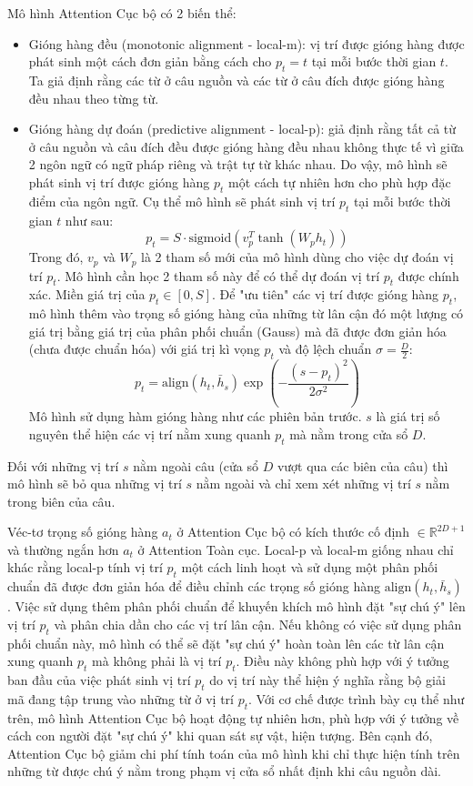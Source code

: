 Mô hình Attention Cục bộ có 2 biến thể:
\begin{itemize}
	\item Gióng hàng đều (monotonic alignment - local-m): vị trí được gióng hàng được phát sinh một cách đơn giản bằng cách cho $p_t = t$ tại mỗi bước thời gian $t$. Ta giả định rằng các từ ở câu nguồn và các từ ở câu đích được gióng hàng đều nhau theo từng từ.
	\item Gióng hàng dự đoán (predictive alignment - local-p): giả định rằng tất cả từ ở câu nguồn và câu đích đều được gióng hàng đều nhau không thực tế vì giữa 2 ngôn ngữ có ngữ pháp riêng và trật tự từ khác nhau. Do vậy, mô hình sẽ phát sinh vị trí được gióng hàng $p_t$ một cách tự nhiên hơn cho phù hợp đặc điểm của ngôn ngữ. Cụ thể mô hình sẽ phát sinh vị trí $p_t$ tại mỗi bước thời gian $t$ như sau:
	\begin{equation}
	p_t = S \cdot \text{sigmoid} (v^T_p \tanh(W_p h_t))
	\end{equation}
	Trong đó, $v_p$ và $W_p$ là 2 tham số mới của mô hình dùng cho việc dự đoán vị trí $p_t$. Mô hình cần học 2 tham số này để có thể dự đoán vị trí $p_t$ được chính xác. Miền giá trị của $p_t \in [0, S]$.
	Để "ưu tiên" các vị trí được gióng hàng $p_t$, mô hình thêm vào trọng số gióng hàng của những từ lân cận đó một lượng có giá trị bằng giá trị của phân phối chuẩn (Gauss) mà đã được đơn giản hóa (chưa được chuẩn hóa) với giá trị kì vọng $p_t$ và độ lệch chuẩn $\sigma = \frac{D}{2}$:
	\begin{equation}
	p_t = \text{align}(h_t, \bar{h}_s)\exp\left(-\frac{(s-p_t)^2}{2\sigma^2}\right)
	\end{equation}
	Mô hình sử dụng hàm gióng hàng như các phiên bản trước. $s$ là giá trị số nguyên thể hiện các vị trí nằm xung quanh $p_t$ mà nằm trong cửa sổ $D$.
\end{itemize}
 Đối với những vị trí $s$ nằm ngoài câu (cửa sổ $D$ vượt qua các biên của câu) thì mô hình sẽ bỏ qua những vị trí $s$ nằm ngoài và chỉ xem xét những vị trí $s$ nằm trong biên của câu.
 
 Véc-tơ trọng số gióng hàng $a_t$ ở Attention Cục bộ có kích thước cố định $\in \mathbb{R}^{2D + 1}$ và thường ngắn hơn $a_t$ ở Attention Toàn cục. Local-p và local-m giống nhau chỉ khác rằng local-p tính vị trí $p_t$ một cách linh hoạt và sử dụng một phân phối chuẩn đã được đơn giản hóa để điều chỉnh các trọng số gióng hàng $\text{align}(h_t, \bar{h}_s)$. Việc sử dụng thêm phân phối chuẩn để khuyến khích mô hình đặt "sự chú ý" lên vị trí $p_t$ và phân chia dần cho các vị trí lân cận. Nếu không có việc sử dụng phân phối chuẩn này, mô hình có thể sẽ đặt "sự chú ý" hoàn toàn lên các từ lân cận xung quanh $p_t$ mà không phải là vị trí $p_t$. Điều này không phù hợp với ý tưởng ban đầu của việc phát sinh vị trí $p_t$ do vị trí này thể hiện ý nghĩa rằng bộ giải mã đang tập trung vào những từ ở vị trí $p_t$.
Với cơ chế được trình bày cụ thể như trên, mô hình Attention Cục bộ hoạt động tự nhiên hơn, phù hợp với ý tưởng về cách con người đặt "sự chú ý" khi quan sát sự vật, hiện tượng. Bên cạnh đó, Attention Cục bộ giảm chi phí tính toán của mô hình khi chỉ thực hiện tính trên những từ được chú ý nằm trong phạm vị cửa sổ nhất định khi câu nguồn dài.

